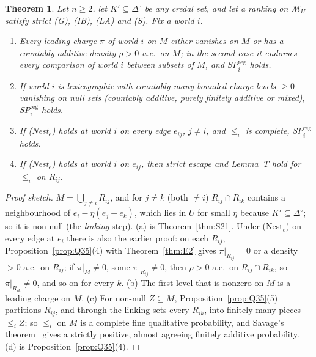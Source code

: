 \documentclass[11pt]{article}
\newtheorem{theorem}{Theorem}[section]
\theoremstyle{definition}
\theoremstyle{remark}
\newcommand{\Di}{\Delta^{\circ}}
\newcommand{\M}{\mathcal M}
\begin{document}
\begin{theorem}\label{thm:Q36}
Let $n\ge2$, let $K'\subseteq\Di$ be any credal set, and let a ranking on $\M_U$ satisfy strict (G), (IB), (LA) and (S). Fix a world $i$.
\begin{enumerate}[leftmargin=*,label=(\alph*)]
\item Every leading charge $\pi$ of world $i$ on $M$ either vanishes on $M$ or has a countably additive density $\rho>0$ a.e.\ on $M$; in the second case it endorses every comparison of world $i$ between subsets of $M$, and SP$^{\mathrm{reg}}_i$ holds.
\item If world $i$ is lexicographic with countably many bounded charge levels $\ge0$ vanishing on null sets (countably additive, purely finitely additive or mixed), SP$^{\mathrm{reg}}_i$ holds.
\item If (Nest$_e$) holds at world $i$ on every edge $e_{ij}$, $j\ne i$, and $\le_i$ is complete, SP$^{\mathrm{reg}}_i$ holds.
\item If (Nest$_e$) holds at world $i$ on $e_{ij}$, then strict escape and Lemma~T hold for $\le_i$ on $R_{ij}$.
\end{enumerate}
\end{theorem}
\begin{proof}[Proof sketch]
$M=\bigcup_{j\ne i}R_{ij}$, and for $j\ne k$ (both $\ne i$) $R_{ij}\cap R_{ik}$ contains a neighbourhood of $e_i-\eta(e_j+e_k)$, which lies in $U$ for small $\eta$ because $K'\subseteq\Di$; so it is non-null (the \emph{linking} step). (a) is Theorem~\ref{thm:S21}. Under (Nest$_e$) on every edge at $e_i$ there is also the earlier proof: on each $R_{ij}$, Proposition~\ref{prop:Q35}(4) with Theorem~\ref{thm:E2} gives $\pi|_{R_{ij}}=0$ or a density $>0$ a.e.\ on $R_{ij}$; if $\pi|_M\ne0$, some $\pi|_{R_{ij}}\ne0$, then $\rho>0$ a.e.\ on $R_{ij}\cap R_{ik}$, so $\pi|_{R_{ik}}\ne0$, and so on for every $k$. (b) The first level that is nonzero on $M$ is a leading charge on $M$. (c) For non-null $Z\subseteq M$, Proposition~\ref{prop:Q35}(5) partitions $R_{ij}$, and through the linking sets every $R_{ik}$, into finitely many pieces $\le_iZ$; so $\le_i$ on $M$ is a complete fine qualitative probability, and Savage's theorem~\cite{Sav1954,Fis1986} gives a strictly positive, almost agreeing finitely additive probability. (d) is Proposition~\ref{prop:Q35}(4).
\end{proof}
\end{document}
